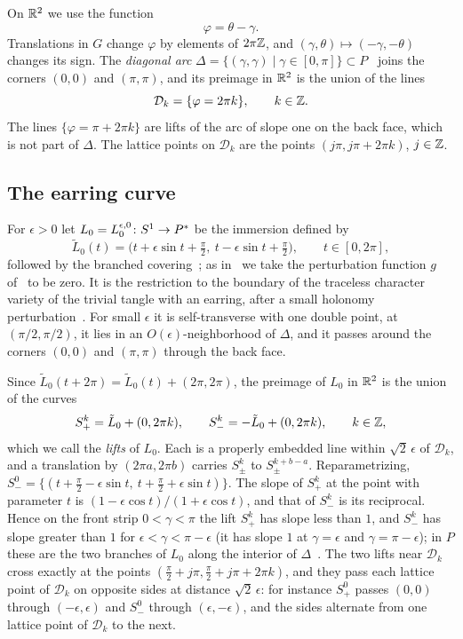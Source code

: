 On $\mathbb{R}^2$ we use the function
\[
\varphi=\theta-\gamma .
\]
Translations in $G$ change $\varphi$ by elements of $2\pi\mathbb{Z}$, and $(\gamma,\theta)\mapsto(-\gamma,-\theta)$ changes
its sign. The \emph{diagonal arc} $\Delta=\{(\gamma,\gamma)\mid\gamma\in[0,\pi]\}\subset P$~\cite[(12)]{HHK2} joins
the corners $(0,0)$ and $(\pi,\pi)$, and its preimage in $\mathbb{R}^2$ is the union of the lines
\[
\mathcal D_k=\{\varphi=2\pi k\},\qquad k\in\mathbb{Z} .
\]
The lines $\{\varphi=\pi+2\pi k\}$ are lifts of the arc of slope one on the back face, which is not part of
$\Delta$. The lattice points on $\mathcal D_k$ are the points $(j\pi,j\pi+2\pi k)$, $j\in\mathbb{Z}$.

\subsection{The earring curve}\label{ss:earring}
For $\epsilon>0$ let $L_0=L_0^{\epsilon,0}\colon S^1\to P^{*}$ be the immersion defined by
\begin{equation}\label{eq:L0}
\tilde L_0(t)=\bigl(t+\epsilon\sin t+\tfrac\pi2,\ t-\epsilon\sin t+\tfrac\pi2\bigr),\qquad t\in[0,2\pi],
\end{equation}
followed by the branched covering~\cite[Def.~3.4, (13)]{HHK2}; as in~\cite[\S11]{HHK2} we take the perturbation
function $g$ of~\cite[(13)]{HHK2} to be zero. It is the restriction to the boundary of the traceless character
variety of the trivial tangle with an earring, after a small holonomy perturbation~\cite[Thm.~6.2]{HHK2}. For
small $\epsilon$ it is self-transverse with one double point, at $(\pi/2,\pi/2)$, it lies in an
$O(\epsilon)$-neighborhood of $\Delta$, and it passes around the corners $(0,0)$ and $(\pi,\pi)$ through the back
face.

Since $\tilde L_0(t+2\pi)=\tilde L_0(t)+(2\pi,2\pi)$, the preimage of $L_0$ in $\mathbb{R}^2$ is the union of the curves
\[
S^k_+=\tilde L_0+(0,2\pi k),\qquad S^k_-=-\tilde L_0+(0,2\pi k),\qquad k\in\mathbb{Z},
\]
which we call the \emph{lifts} of $L_0$. Each is a properly embedded line within $\sqrt2\,\epsilon$ of $\mathcal D_k$,
and a translation by $(2\pi a,2\pi b)$ carries $S^k_\pm$ to $S^{k+b-a}_\pm$. Reparametrizing,
$S^0_-=\{(t+\frac\pi2-\epsilon\sin t,\ t+\frac\pi2+\epsilon\sin t)\}$. The slope of $S^k_+$ at the point with parameter $t$ is $(1-\epsilon\cos t)/(1+\epsilon\cos t)$, and that of $S^k_-$ is its reciprocal. Hence on the front
strip $0<\gamma<\pi$ the lift $S^k_+$ has slope less than $1$, and $S^k_-$ has slope greater than $1$ for
$\epsilon<\gamma<\pi-\epsilon$ (it has slope $1$ at $\gamma=\epsilon$ and $\gamma=\pi-\epsilon$); in $P$ these
are the two branches of $L_0$ along the interior of $\Delta$~\cite[\S5.1]{HHK2}. The two lifts near $\mathcal D_k$
cross exactly at the points $(\frac\pi2+j\pi,\frac\pi2+j\pi+2\pi k)$, and they pass each lattice point of $\mathcal D_k$
on opposite sides at distance $\sqrt2\,\epsilon$: for instance $S^0_+$ passes $(0,0)$ through $(-\epsilon,\epsilon)$
and $S^0_-$ through $(\epsilon,-\epsilon)$, and the sides alternate from one lattice point of $\mathcal D_k$ to the next.


